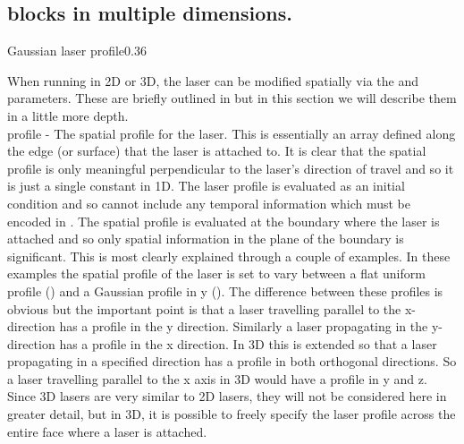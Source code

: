 \subsection{\texorpdfstring
  { blocks in multiple dimensions.}
  {           {laser} blocks in multiple dimensions.}}
\label{sec:multilaser}

    {Gaussian laser profile}{0.36}

When running {\EPOCH} in 2D or 3D, the laser can be modified spatially
via the  and  parameters. These
are briefly outlined in  but in this section we will describe
them in a little more depth.\\

{\emphtext profile} - The spatial profile for the laser. This is
essentially an array defined along the edge (or surface) that the laser is
attached to. It is clear that the spatial profile is only meaningful
perpendicular to the laser's direction of travel and so it is just a single
constant in 1D. The laser profile is evaluated as an initial condition
and so cannot include any temporal information which must be
encoded in .  The spatial profile is evaluated at the
boundary where the laser is attached and so only spatial information in the
plane of the boundary is significant. This is most clearly explained through a
couple of examples. In these examples the spatial profile of the laser is set
to vary between a flat uniform profile () and a
Gaussian profile in y (). The
difference between these profiles is obvious but the important point is that a
laser travelling parallel to the x-direction has a profile in the y
direction. Similarly a laser propagating in the y-direction has a profile in
the x direction. In 3D this is extended so that a laser propagating in a
specified direction has a profile in both orthogonal directions. So a laser
travelling parallel to the x axis in 3D would have a profile in y and z. Since
3D lasers are very similar to 2D lasers, they will not be considered here in
greater detail, but in 3D, it is possible to freely specify the laser profile
across the entire face where a laser is attached.\\


